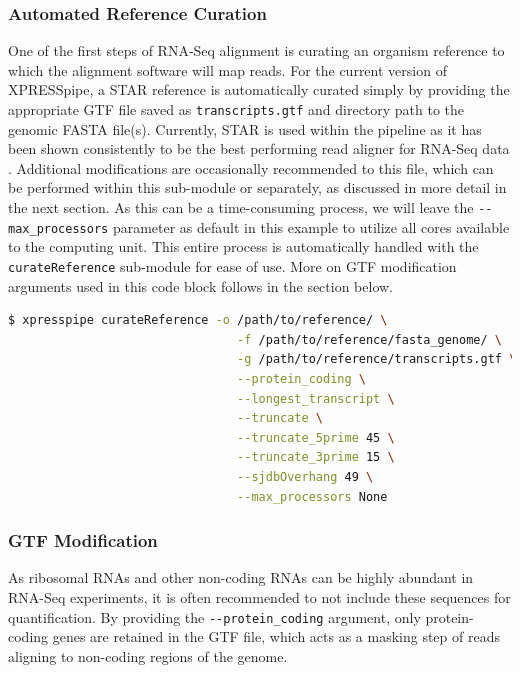 \documentclass[10pt, oneside]{article}
\begin{document}
\subsubsection{Automated Reference Curation}
One of the first steps of RNA-Seq alignment is curating an organism reference to which the alignment software will map reads. For the current version of XPRESSpipe, a STAR \cite{star} reference is automatically curated simply by providing the appropriate GTF file saved as \texttt{transcripts.gtf} and directory path to the genomic FASTA file(s). Currently, STAR is used within the pipeline as it has been shown consistently to be the best performing read aligner for RNA-Seq data \cite{alignment_benchmark}. Additional modifications are occasionally recommended to this file, which can be performed within this sub-module or separately, as discussed in more detail in the next section. As this can be a time-consuming process, we will leave the \texttt{-{}-max\_processors} parameter as default in this example to utilize all cores available to the computing unit. This entire process is automatically handled with the \texttt{curateReference} sub-module for ease of use. More on GTF modification arguments used in this code block follows in the section below.
\newline
\begin{lstlisting}[language=bash, caption=curateReference example]
$ xpresspipe curateReference -o /path/to/reference/ \
                                -f /path/to/reference/fasta_genome/ \
                                -g /path/to/reference/transcripts.gtf \
                                --protein_coding \
                                --longest_transcript \
                                --truncate \
                                --truncate_5prime 45 \
                                --truncate_3prime 15 \
                                --sjdbOverhang 49 \
                                --max_processors None
\end{lstlisting}


\subsubsection{GTF Modification}
As ribosomal RNAs and other non-coding RNAs can be highly abundant in RNA-Seq experiments, it is often recommended to not include these sequences for quantification. By providing the \texttt{-{}-protein\_coding} argument, only protein-coding genes are retained in the GTF file, which acts as a masking step of reads aligning to non-coding regions of the genome. \par
\end{document}
